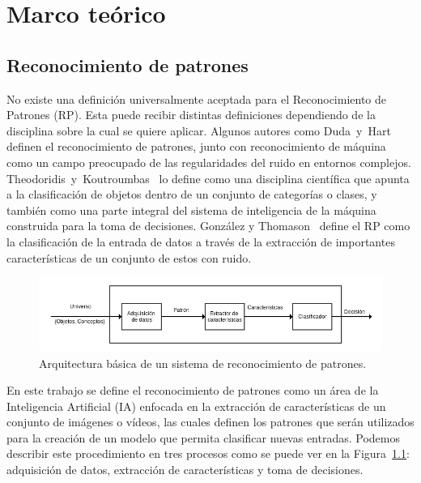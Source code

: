 \chapter[Marco teórico]{Marco teórico}
\label{ch:estado_del_arte}

\section{Reconocimiento de patrones}
\label{sec:rec_patrones}
	No existe una definición universalmente aceptada para el Reconocimiento de Patrones (RP). Esta puede recibir distintas definiciones dependiendo de la disciplina sobre la cual se quiere aplicar. Algunos autores como Duda~y~Hart~\cite{Duda1973} definen el reconocimiento de patrones, junto con reconocimiento de máquina como un campo preocupado de las regularidades del ruido en entornos complejos. Theodoridis~y~Koutroumbas~\cite{Theodoridis2008} lo define como una disciplina científica que apunta a la clasificación de objetos dentro de un conjunto de categorías o clases, y también como una parte integral del sistema de inteligencia de la máquina construida para la toma de decisiones. González y Thomason~\cite{Gonzalez1978} define el RP como la clasificación de la entrada de datos a través de la extracción de importantes características de un conjunto de estos con ruido. 

\begin{figure}[b]
  \centering
   \includegraphics[width=1\textwidth]{Figuras/Diagramas/estado_del_arte/Reconocimiento_de_patrones.png}
  \caption{Arquitectura básica de un sistema de reconocimiento de patrones.}
  \label{art:fig:arquitectura}
\end{figure}


En este trabajo se define el reconocimiento de patrones como un área de la Inteligencia Artificial (IA) enfocada en la extracción de características de un conjunto de imágenes o vídeos, las cuales definen los patrones que serán utilizados para la creación de un modelo que permita clasificar nuevas entradas. Podemos describir este procedimiento en tres procesos como se puede ver en la Figura~\ref{art:fig:arquitectura}: adquisición de datos, extracción de características y toma de decisiones. 

